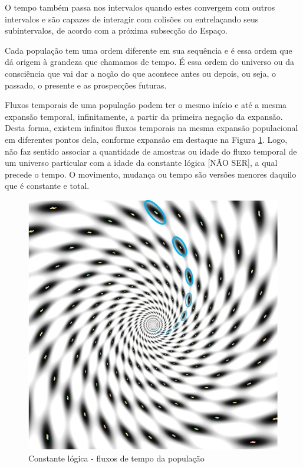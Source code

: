 O tempo também passa nos intervalos quando estes convergem com outros intervalos e são capazes de interagir com colisões ou entrelaçando seus subintervalos, de acordo com a próxima subsecção do Espaço.

Cada população tem uma ordem diferente em sua sequência e é essa ordem que dá origem à grandeza que chamamos de tempo. É essa ordem do universo ou da consciência que vai dar a noção do que acontece antes ou depois, ou seja, o passado, o presente e as prospecções futuras.

Fluxos temporais de uma população podem ter o mesmo início e até a mesma expansão temporal, infinitamente, a partir da primeira negação da expansão. Desta forma, existem infinitos fluxos temporais na mesma expansão populacional em diferentes pontos dela, conforme expansão em destaque na Figura \ref{fig:consciousness_constant_time}. Logo, não faz sentido associar a quantidade de amostras ou idade do fluxo temporal de um universo particular com a idade da constante lógica [NÃO SER], a qual precede o tempo. O movimento, mudança ou tempo são versões menores daquilo que é constante e total.
	\begin{figure}[H]
	\caption{Constante lógica - fluxos de tempo da população}
	\label{fig:consciousness_constant_time}
	\centering
	\includegraphics[scale=.6]{sections/images/consciousness_constant_time.jpg}
	\end{figure}

